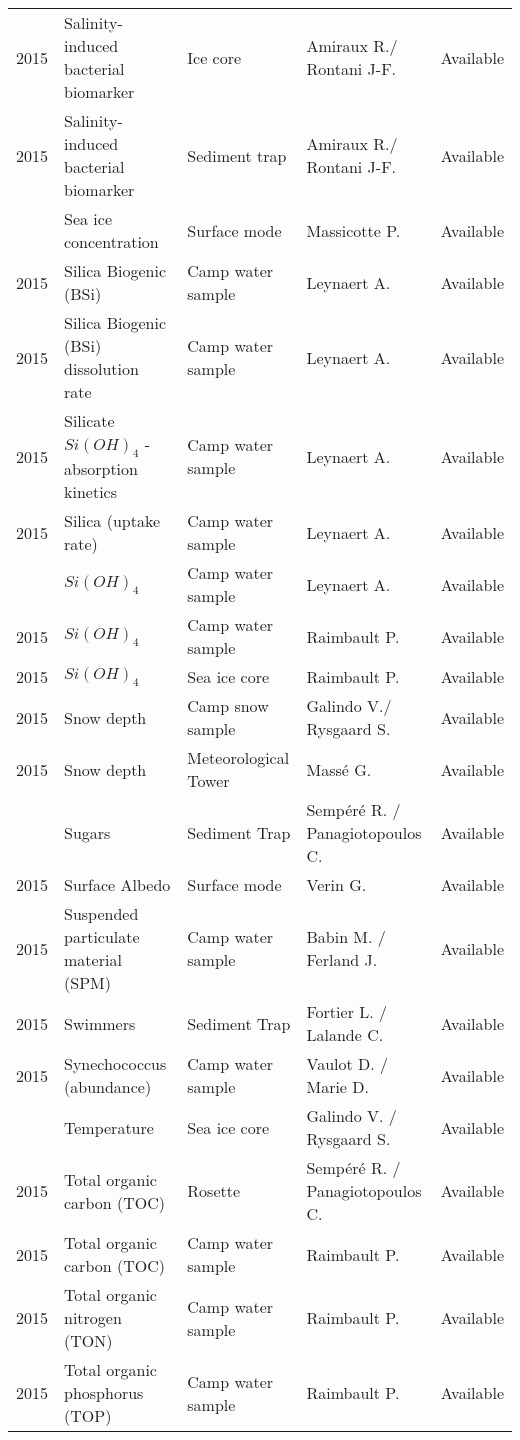 \documentclass[]{article}
\begin{document}
\begin{landscape}
\begin{longtable}{rllll}
2015 & Salinity-induced bacterial biomarker & Ice core & Amiraux R./ Rontani J-F. & Available\\
2015 & Salinity-induced bacterial biomarker & Sediment trap & Amiraux R./ Rontani J-F. & Available\\
\addlinespace
2015 & Sea ice concentration & Surface mode & Massicotte P. & Available\\
2015 & Silica Biogenic (BSi) & Camp water sample & Leynaert A. & Available\\
2015 & Silica Biogenic (BSi) dissolution rate & Camp water sample & Leynaert A. & Available\\
2015 & Silicate $Si(OH)_4$ - absorption kinetics & Camp water sample & Leynaert A. & Available\\
2015 & Silica (uptake rate) & Camp water sample & Leynaert A. & Available\\
\addlinespace
2015 & $Si(OH)_4$ & Camp water sample & Leynaert A. & Available\\
2015 & $Si(OH)_4$ & Camp water sample & Raimbault P. & Available\\
2015 & $Si(OH)_4$ & Sea ice core & Raimbault P. & Available\\
2015 & Snow depth & Camp snow sample & Galindo V./ Rysgaard S. & Available\\
2015 & Snow depth & Meteorological Tower & Massé G. & Available\\
\addlinespace
2015 & Sugars & Sediment Trap & Sempéré R. / Panagiotopoulos C. & Available\\
2015 & Surface Albedo & Surface mode & Verin G. & Available\\
2015 & Suspended particulate material (SPM) & Camp water sample & Babin M. / Ferland J. & Available\\
2015 & Swimmers & Sediment Trap & Fortier L. / Lalande C. & Available\\
2015 & Synechococcus (abundance) & Camp water sample & Vaulot D. / Marie D. & Available\\
\addlinespace
2015 & Temperature & Sea ice core & Galindo V. / Rysgaard S. & Available\\
2015 & Total organic carbon (TOC) & Rosette & Sempéré R. / Panagiotopoulos C. & Available\\
2015 & Total organic carbon (TOC) & Camp water sample & Raimbault P. & Available\\
2015 & Total organic nitrogen (TON) & Camp water sample & Raimbault P. & Available\\
2015 & Total organic phosphorus (TOP) & Camp water sample & Raimbault P. & Available\\

\end{longtable}
\end{landscape}
\end{document}
